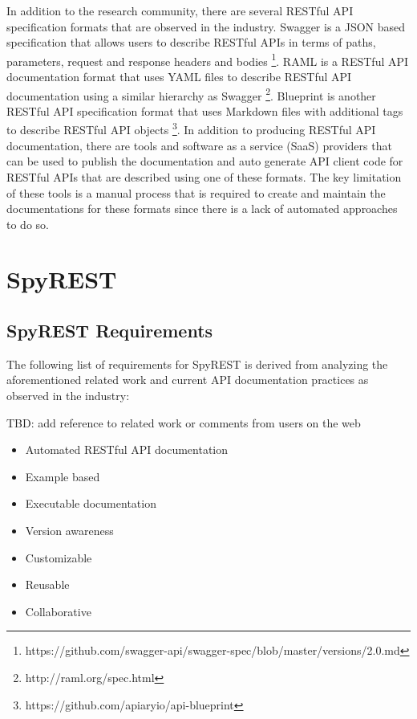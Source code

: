 \documentclass[conference]{IEEEtran}
\begin{document}
In addition to the research community, there are several RESTful API specification formats that are observed in the industry. Swagger is a JSON based specification that allows users to describe RESTful APIs in terms of paths, parameters, request and response headers and bodies \footnote{https://github.com/swagger-api/swagger-spec/blob/master/versions/2.0.md}. RAML is a RESTful API documentation format that uses YAML files to describe RESTful API documentation using a similar hierarchy as Swagger \footnote{http://raml.org/spec.html}. Blueprint is another RESTful API specification format that uses Markdown files with additional tags to describe RESTful API objects \footnote{https://github.com/apiaryio/api-blueprint}. In addition to producing RESTful API documentation, there are tools and software as a service (SaaS) providers that can be used to publish the documentation and auto generate API client code for RESTful APIs that are described using one of these formats. The key limitation of these tools is a manual process that is required to create and maintain the documentations for these formats since there is a lack of automated approaches to do so.


\section{SpyREST} %
\label{sec:spyrest}

\subsection{SpyREST Requirements} %
\label{sub:spyrest_requirements}

The following list of requirements for SpyREST is derived from analyzing the aforementioned related work and current API documentation practices as observed in the industry:

TBD: add reference to related work or comments from users on the web

\begin{itemize}
  \item Automated RESTful API documentation
  \item Example based
  \item Executable documentation
  \item Version awareness
  \item Customizable
  \item Reusable
  \item Collaborative
\end{itemize}
\end{document}
